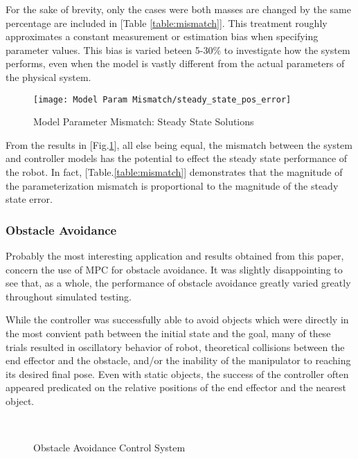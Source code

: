 \documentclass[journal]{IEEEtran}
\begin{document}
For the sake of brevity, only the cases were both masses are changed by the same percentage are included in [Table \ref{table:mismatch}]. This treatment roughly approximates a constant measurement or estimation bias when specifying parameter values. This bias is varied beteen 5-30\% to investigate how the system performs, even when the model is vastly different from the actual parameters of the physical system.

\begin{figure}[ht]%
    \centering
    \texttt{[image: Model Param Mismatch/steady\_state\_pos\_error]}
    \caption{Model Parameter Mismatch: Steady State Solutions}%
    \label{fig:model_param_mismatch}%
\end{figure}


From the results in [Fig.\ref{fig:model_param_mismatch}], all else being equal, the mismatch between the system and controller models has the potential to effect the steady state performance of the robot. In fact, [Table.\ref{table:mismatch}] demonstrates that the magnitude of the parameterization mismatch is proportional to the magnitude of the steady state error.\\

\subsubsection{Obstacle Avoidance}

Probably the most interesting application and results obtained from this paper, concern the use of MPC for obstacle avoidance. It was slightly disappointing to see that, as a whole, the performance of obstacle avoidance greatly varied greatly throughout simulated testing.

While the controller was successfully able to avoid objects which were directly in the most convient path between the initial state and the goal, many of these trials resulted in oscillatory behavior of robot, theoretical collisions between the end effector and the obstacle, and/or the inability of the manipulator to reaching its desired final pose. Even with static objects, the success of the controller often appeared predicated on the relative positions of the end effector and the nearest object. \\

\begin{figure}[ht]%
    \centering
    \qquad
    \\
    \qquad
    \caption{Obstacle Avoidance Control System}%
    \label{fig:obs_avoid_path}%
\end{figure}
\end{document}
